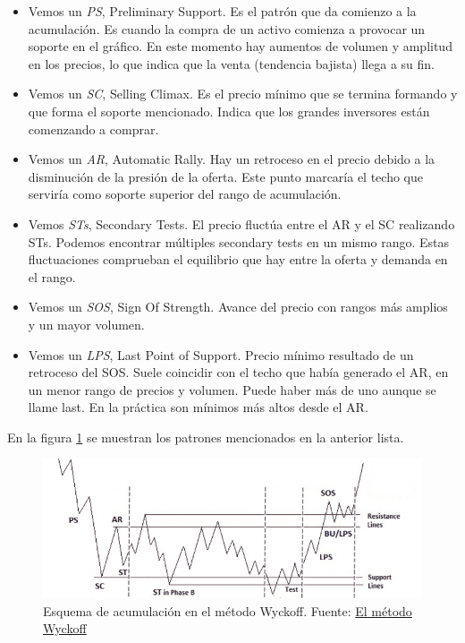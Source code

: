 \begin{itemize}
	\item Vemos un \textit{PS}, Preliminary Support. Es el patrón que da comienzo a la acumulación. Es cuando la compra de un activo comienza a provocar un soporte en el gráfico. En este momento hay aumentos de volumen y amplitud en los precios, lo que indica que la venta (tendencia bajista) llega a su fin.
	\item Vemos un \textit{SC}, Selling Climax. Es el precio mínimo que se termina formando y que forma el soporte mencionado. Indica que los grandes inversores están comenzando a comprar.
	\item Vemos un \textit{AR}, Automatic Rally. Hay un retroceso en el precio debido a la disminución de la presión de la oferta. Este punto marcaría el techo que serviría como soporte superior del rango de acumulación.
	\item Vemos \textit{STs}, Secondary Tests. El precio fluctúa entre el AR y el SC realizando STs. Podemos encontrar múltiples secondary tests en un mismo rango. Estas fluctuaciones comprueban el equilibrio que hay entre la oferta y demanda en el rango.
	\item Vemos un \textit{SOS}, Sign Of Strength. Avance del precio con rangos más amplios y un mayor volumen.
	\item Vemos un \textit{LPS}, Last Point of Support. Precio mínimo resultado de un retroceso del SOS. Suele coincidir con el techo que había generado el AR, en un menor rango de precios y volumen. Puede haber más de uno aunque se llame last. En la práctica son mínimos más altos desde el AR.
\end{itemize}

En la figura \ref{esquema_acumulacion} se muestran los patrones mencionados en la anterior lista. \newline


\begin{figure}[h]
	\includegraphics[width=1.1\textwidth]{imagenes/esquema_acumulacion_wyckoff.png} 
	\caption{Esquema de acumulación en el método Wyckoff. Fuente: \color{blue} \href{https://www.wyckoffanalytics.com/wyckoff-method-spanish/}{El método Wyckoff}} \label{esquema_acumulacion}
\end{figure}


